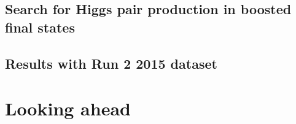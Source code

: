 \documentclass{Dissertate}
\begin{document}
\chapter{Search for Higgs pair production in boosted final states}


\chapter{Results with Run 2 2015 dataset}

\part{Looking ahead}

%    


\clearpage




\end{document}
